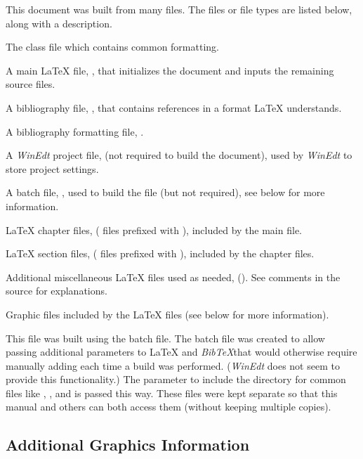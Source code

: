 This document was built from many files.  The files or file types are listed below, along with a description.
    \begin{bulletedlist}
        \item The class file  which contains common formatting.
        \item A main \LaTeX{} file, , that initializes the document and inputs the remaining source files.
        \item A bibliography file, , that contains references in a format \LaTeX{} understands.
        \item A bibliography formatting file, .
        \item A \emph{WinEdt} project file,  (not required to build the document), used by \emph{WinEdt} to store project settings.
        \item A batch file, , used to build the file (but not required), see below for more information.
        \item \LaTeX{} chapter files, ( files prefixed with ), included by the main file.
        \item \LaTeX{} section files, ( files prefixed with ), included by the chapter files.
        \item Additional miscellaneous \LaTeX{} files used as needed, ().  See comments in the source for explanations.
        \item Graphic files included by the \LaTeX{} files (see below for more information).
    \end{bulletedlist}

This file was built using the  batch file.  The batch file was created to allow passing additional parameters to \LaTeX{} and \emph{BibTeX}\@ that would otherwise require manually adding each time a build was performed.  (\emph{WinEdt} does not seem to provide this functionality.)  The parameter to include the directory for common files like , , and  is passed this way.  These files were kept separate so that this manual and others can both access them (without keeping multiple copies).

    \subsection*{Additional Graphics Information}

